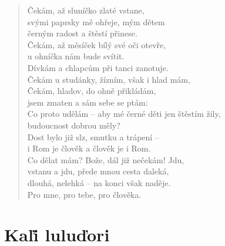 \begin{verse}
Čekám, až sluníčko zlaté vstane,  \\
\hspace{\fill}svými paprsky mě ohřeje, mým dětem \\
černým radost a štěstí přinese. \\
Čekám, až měsíček bílý své oči otevře,  \\
\hspace{\fill}u ohníčka nám bude svítit. \\
Dívkám a chlapcům při tanci zanotuje. \\
Čekám u studánky, žízním, však i hlad mám, \\
Čekám, hladov, do ohně přikládám,  \\
\hspace{\fill}jsem zmaten a sám sebe se ptám: \\
Co proto udělám – aby mé černé děti jen štěstím žily,  \\
\hspace{\fill}budoucnost dobrou měly? \\
Dost bylo již slz, smutku a trápení –  \\
\hspace{\fill}i Rom je člověk a člověk je i Rom. \\
Co dělat mám? Bože, dál již nečekám! Jdu, \\
\hspace{\fill}vstanu a jdu, přede mnou cesta daleká, \\
\hspace{\fill}dlouhá, nelehká – na konci však naděje. \\
Pro mne, pro tebe, pro člověka.
\end{verse}



\section{Kaľi luluďori}

